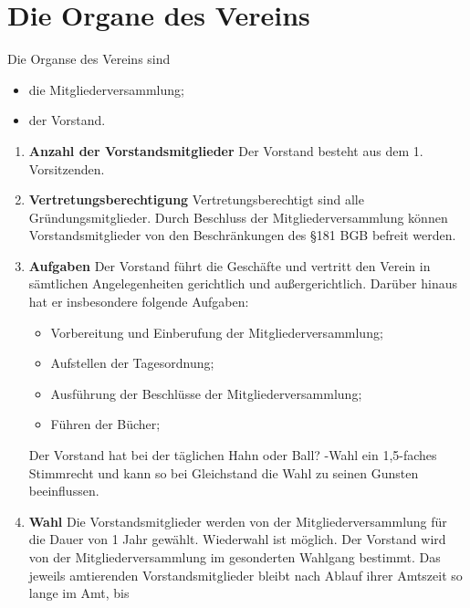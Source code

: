 \documentclass{scrartcl}
\begin{document}
    \section{Die Organe des Vereins}
        Die Organse des Vereins sind
        \begin{itemize}
            \item die Mitgliederversammlung;
            \item der Vorstand.
        \end{itemize}
        \begin{enumerate}
            \item \textbf{Anzahl der Vorstandsmitglieder} \newline
                Der Vorstand besteht aus dem 1. Vorsitzenden.
            \item \textbf{Vertretungsberechtigung} \newline
                Vertretungsberechtigt sind alle Gründungsmitglieder. 
                Durch Beschluss der Mitgliederversammlung können Vorstandsmitglieder von den Beschränkungen des \S 181 BGB befreit werden.
            \item \textbf{Aufgaben} \newline
                Der Vorstand führt die Geschäfte und vertritt den Verein in sämtlichen Angelegenheiten
                gerichtlich und außergerichtlich. Darüber hinaus hat er insbesondere folgende Aufgaben:
                \begin{itemize}
                    \item Vorbereitung und Einberufung der Mitgliederversammlung;
                    \item Aufstellen der Tagesordnung;
                    \item Ausführung der Beschlüsse der Mitgliederversammlung;
                    \item Führen der Bücher;
                \end{itemize}
                Der Vorstand hat bei der täglichen \dq Hahn oder Ball? \dq-Wahl ein 1,5-faches Stimmrecht und kann so bei Gleichstand die Wahl zu seinen Gunsten beeinflussen.
            \item \textbf{Wahl} \newline
                Die Vorstandsmitglieder werden von der Mitgliederversammlung für die Dauer von 1 Jahr
                gewählt. Wiederwahl ist möglich. Der Vorstand wird von der
                Mitgliederversammlung im gesonderten Wahlgang bestimmt. 
                Das jeweils amtierenden Vorstandsmitglieder bleibt nach Ablauf ihrer Amtszeit so lange im Amt, bis

\end{enumerate}
\end{document}

